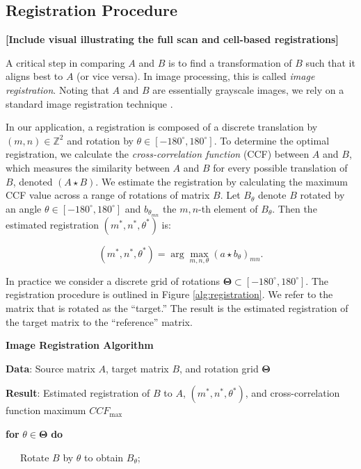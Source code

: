 \documentclass[11pt,]{isuthesis}
\begin{document}
\hypertarget{registration-procedure}{%
\subsection{Registration Procedure}\label{registration-procedure}}

\textbf{{[}Include visual illustrating the full scan and cell-based registrations{]}}

A critical step in comparing \(A\) and \(B\) is to find a transformation of \(B\) such that it aligns best to \(A\) (or vice versa).
In image processing, this is called \emph{image registration}. Noting that \(A\) and \(B\) are essentially grayscale images, we rely on a standard image registration technique \citep{Brown1992}.

In our application, a registration is composed of a discrete translation by \((m,n) \in \mathbb{Z}^2\) and rotation by \(\theta \in [-180^\circ,180^\circ]\).
To determine the optimal registration, we calculate the \emph{cross-correlation function} (CCF) between \(A\) and \(B\), which measures the similarity between \(A\) and \(B\) for every possible translation of \(B\), denoted \((A \star B)\).
We estimate the registration by calculating the maximum CCF value across a range of rotations of matrix \(B\).
Let \(B_\theta\) denote \(B\) rotated by an angle \(\theta \in [-180^\circ,180^\circ]\) and \(b_{\theta_{mn}}\) the \(m,n\)-th element of \(B_\theta\).
Then the estimated registration \((m^*,n^*,\theta^*)\) is:

\[
(m^*,n^*,\theta^*) = \arg \max_{m,n,\theta} (a \star b_\theta)_{mn}.
\]

In practice we consider a discrete grid of rotations \(\pmb{\Theta} \subset [-180^\circ,180^\circ]\).
The registration procedure is outlined in Figure \ref{alg:registration}.
We refer to the matrix that is rotated as the ``target.''
The result is the estimated registration of the target matrix to the ``reference'' matrix.

\textbf{Image Registration Algorithm}

\textbf{Data}: Source matrix \(A\), target matrix \(B\), and rotation grid \(\pmb{\Theta}\)

\textbf{Result}: Estimated registration of \(B\) to \(A\), \((m^*, n^*, \theta^*)\), and cross-correlation function maximum \(CCF_{\max}\)

\textbf{for} \(\theta \in \pmb{\Theta}\) \textbf{do}

~~~Rotate \(B\) by \(\theta\) to obtain \(B_\theta\);
\end{document}
